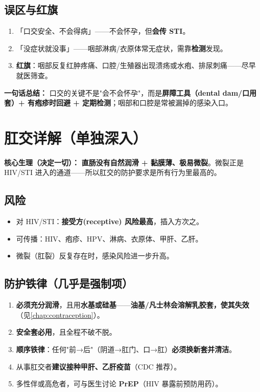 \documentclass[12pt,UTF8,openany]{ctexbook}
\begin{document}
\section{误区与红旗}

\begin{enumerate}[leftmargin=2em,itemsep=0.3em]
  \item 「口交安全、不会得病」——不会怀孕，但\textbf{会传 STI}。
  \item 「没症状就没事」——咽部淋病/衣原体常无症状，需靠\textbf{检测}发现。
  \item \textbf{红旗}：咽部反复红肿疼痛、口腔/生殖器出现溃疡或水疱、排尿刺痛——尽早就医筛查。
\end{enumerate}

\vspace{1em}
\noindent\textbf{一句话总结：} 口交的关键不是"会不会怀孕"，而是\textbf{屏障工具（dental dam/口用套）+ 有疱疹时回避 + 定期检测}；咽部和口腔是常被漏掉的感染入口。

\chapter{肛交详解（单独深入）}
\label{chap:anal}

\noindent\textbf{核心生理（决定一切）：} \textbf{直肠没有自然润滑 + 黏膜薄、极易微裂}。微裂正是 HIV/STI 进入的通道——所以肛交的防护要求是所有行为里最高的。

\section{风险}

\begin{itemize}[leftmargin=2em,itemsep=0.3em]
  \item 对 HIV/STI：\textbf{接受方(receptive) 风险最高}，插入方次之。
  \item 可传播：HIV、疱疹、HPV、淋病、衣原体、甲肝、乙肝。
  \item 微裂（肛裂）反复存在时，感染风险进一步升高。
\end{itemize}

\section{防护铁律（几乎是强制项）}

\begin{enumerate}[leftmargin=2em,itemsep=0.3em]
  \item \textbf{必须充分润滑}，且用\textbf{水基或硅基}——\textbf{油基/凡士林会溶解乳胶套，使其失效}（见\ref{chap:contraception}）。
  \item \textbf{安全套必用}，且全程不破不脱。
  \item \textbf{顺序铁律}：任何"前→后"（阴道→肛门、口→肛）\textbf{必须换新套并清洁}。
  \item 从事肛交者\textbf{建议接种甲肝、乙肝疫苗}（CDC 推荐）。
  \item 多性伴或高危者，可与医生讨论 \textbf{PrEP}（HIV 暴露前预防用药）。
\end{enumerate}
\end{document}
